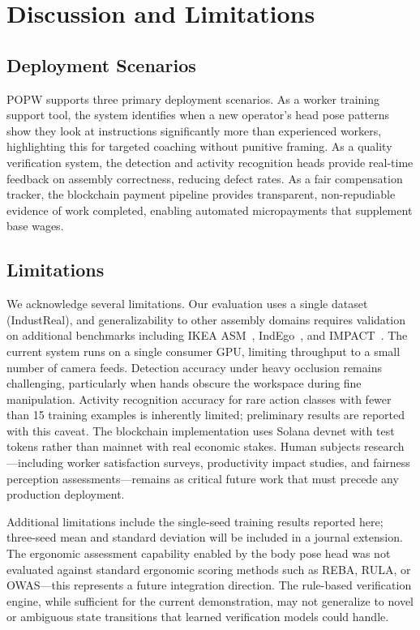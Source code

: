\documentclass[10pt,twocolumn]{article}
\newcommand{\popw}{POPW}
\newcommand{\industreal}{IndustReal}
\begin{document}
\section{Discussion and Limitations}
\label{sec:discussion}

\subsection{Deployment Scenarios}

\popw{} supports three primary deployment scenarios. As a worker training support tool, the system identifies when a new operator's head pose patterns show they look at instructions significantly more than experienced workers, highlighting this for targeted coaching without punitive framing. As a quality verification system, the detection and activity recognition heads provide real-time feedback on assembly correctness, reducing defect rates. As a fair compensation tracker, the blockchain payment pipeline provides transparent, non-repudiable evidence of work completed, enabling automated micropayments that supplement base wages.

\subsection{Limitations}

We acknowledge several limitations. Our evaluation uses a single dataset (\industreal{}), and generalizability to other assembly domains requires validation on additional benchmarks including IKEA ASM~\cite{benshabat2021ikea}, IndEgo~\cite{chavan2025indego}, and IMPACT~\cite{impact2026}. The current system runs on a single consumer GPU, limiting throughput to a small number of camera feeds. Detection accuracy under heavy occlusion remains challenging, particularly when hands obscure the workspace during fine manipulation. Activity recognition accuracy for rare action classes with fewer than 15 training examples is inherently limited; preliminary results are reported with this caveat. The blockchain implementation uses Solana devnet with test tokens rather than mainnet with real economic stakes. Human subjects research---including worker satisfaction surveys, productivity impact studies, and fairness perception assessments---remains as critical future work that must precede any production deployment.

Additional limitations include the single-seed training results reported here; three-seed mean and standard deviation will be included in a journal extension. The ergonomic assessment capability enabled by the body pose head was not evaluated against standard ergonomic scoring methods such as REBA, RULA, or OWAS---this represents a future integration direction. The rule-based verification engine, while sufficient for the current demonstration, may not generalize to novel or ambiguous state transitions that learned verification models could handle.
\end{document}
